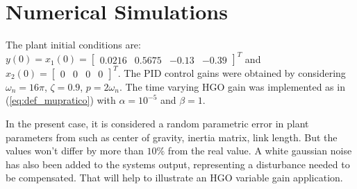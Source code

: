 \documentclass[letterpaper, 10 pt, conference]{ieeeconf}  %
\theoremstyle{plain}
\theoremstyle{definition}
\theoremstyle{remark}
\begin{document}
\section{Numerical Simulations}
\label{sec:Numerical_Simulation}

The plant initial conditions are: $y(0)=x_1(0)=\left[\begin{array}{cccc} 0.0216  & 0.5675 & -0.13 & -0.39\end{array} \right ]^T$ and $x_2(0)=\left[\begin{array}{cccc} 0  & 0 & 0 & 0\end{array} \right ]^T$. The PID control gains were obtained by considering $\omega_n = 16\pi$, $\zeta = 0.9$, $p = 2\omega_n$. The time varying HGO gain was implemented as in (\ref{eq:def_mupratico}) with $\alpha=10^{-5}$ and $\beta=1$.

In the present case, it is considered a random parametric error in plant parameters from \cite{Richter2015} such as center of gravity, inertia matrix, link length. But the values won't differ by more than $10\%$ from the real value. A white gaussian noise has also been added to the systems output, representing a disturbance needed to be compensated. That will help to illustrate an HGO variable gain application.
\end{document}
